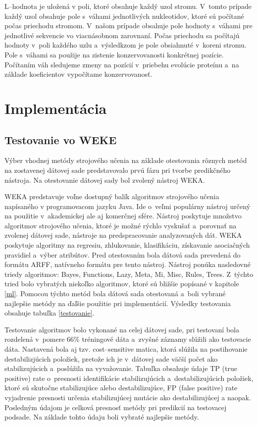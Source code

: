 L--hodnota je uložená v poli, ktoré obsahuje každý uzol stromu. V~tomto prípade každý uzol obsahuje pole s~váhami jednotlivých nukleotidov, ktoré sú počítané počas priechodu stromom. V~našom prípade obsahuje pole hodnoty s~váhami pre jednotlivé sekvencie vo viacnásobnom zarovnaní. Počas priechodu sa počítajú hodnoty v~poli každého uzlu a~výsledkzom je pole obsiahnuté v~koreni stromu. Pole s~váhami sa použije na zistenie konzervovanosti konkrétnej pozície. Počítaním váh sledujeme zmeny na pozícií v~priebehu evolúcie proteínu a~na základe koeficientov vypočítame konzervovanosť.

\chapter{Implementácia}

\section{Testovanie vo WEKE}
\label{wekatest}
Výber vhodnej metódy strojového učenia na základe otestovania rôznych metód na zostavenej dátovej sade predstavovalo prvú fázu pri tvorbe predikčného nástroja. Na otestovanie dátovej sady bol zvolený nástroj WEKA.

WEKA \cite{weka} predstavuje voľne dostupný balík algoritmov strojového učenia napísaného v programovacom jazyku Java. Ide o~veľmi populárny nástroj určený na použitie v~akademickej ale aj komerčnej sfére. Nástroj poskytuje množstvo algoritmov strojového učenia, ktoré je možné rýchlo vyskušať a~porovnať na zvolenej dátovej sade, nástroje na predspracovanie analyzovaných dát. WEKA poskytuje algoritmy na regresiu, zhlukovanie, klasifikáciu, získavanie asociačných pravidiel a~výber atribútov.
Pred otestovaním bola dátová sada prevedená do formátu ARFF, natívneho formátu pre tento nástroj. Nástroj ponúka nasledovné triedy algoritmov: Bayes, Functions, Lazy, Meta, Mi, Misc, Rules, Trees. Z~týchto tried bolo vybratých niekoľko algoritmov, ktoré sú bližšie popísané v kapitole \ref{ml}. Pomocou týchto metód bola dátová sada otestovaná a~boli vybrané najlepšie metódy na ďaľšie použitie pri implementácií. Výsledky testovania obsahuje tabuľka \ref{testovanie}.

Testovanie algoritmov bolo vykonané na celej dátovej sade, pri testovaní bola rozdelená v~pomere 66\% tréningové dáta a~zvyšné záznamy slúžili ako testovacie dáta. Nastavená bola aj tzv. cost--sensitive matica, ktorá slúžila na postihovanie destabilizjúcich položiek, pretože ich je v~dátovej sade väčší počet ako stabilizujúcich a~poslúžila na vyvažovanie. Tabuľka obsahuje údaje TP (true positive) rate o~presnosti identifikácie stabilizujúcich a~destabilizujúcich položiek, ktoré sú skutočne stabilizujúce alebo destabilizujúce, FP (false positive) rate vyjadrenie presnosti určenia stabilizujúcej mutácie ako destabilizujúcej a naopak. Posledným údajom je celková presnosť metódy pri predikcií na testovacej podsade. Na základe tohto údaju boli vybraté najlepšie metódy.


